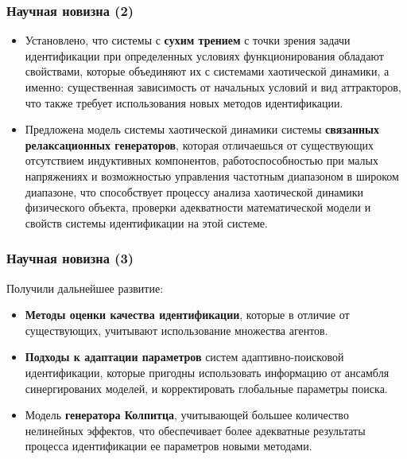 \documentclass[10pt,utf8]{beamer}
\begin{document}

\begin{frame}
  \frametitle{Научная новизна (2)}

  \begin{itemize}

    \item
      Установлено, что системы с \textbf{сухим трением} с точки зрения задачи идентификации при
      определенных условиях функционирования обладают свойствами, которые объединяют их с
      системами хаотической динамики, а именно:
      существенная зависимость от начальных условий и вид аттракторов, что
      также требует использования новых методов идентификации.

    \item
      Предложена модель системы хаотической динамики системы
      \textbf{связанных релаксационных генераторов},
      которая отличаешься от существующих отсутствием индуктивных
      компонентов, работоспособностью при малых напряжениях и возможностью управления
      частотным диапазоном в широком диапазоне, что способствует процессу анализа
      хаотической динамики физического объекта, проверки адекватности математической
      модели и свойств системы идентификации на этой системе.

  \end{itemize}

\end{frame}




\begin{frame}
  \frametitle{Научная новизна (3)}

\noindent
Получили дальнейшее развитие:

  \begin{itemize}

    \item
      \textbf{Методы оценки качества идентификации},
      которые в отличие от существующих,
      учитывают использование множества агентов.

    \item
      \textbf{Подходы к адаптации параметров}
      систем адаптивно-поисковой идентификации,
      которые пригодны использовать информацию от ансамбля синергированих моделей, и
      корректировать глобальные параметры поиска.

    \item
      Модель \textbf{генератора Колпитца}, учитывающей большее количество нелинейных эффектов,
      что обеспечивает более адекватные результаты процесса идентификации ее
      параметров новыми методами.

  \end{itemize}


\end{frame}
\end{document}
